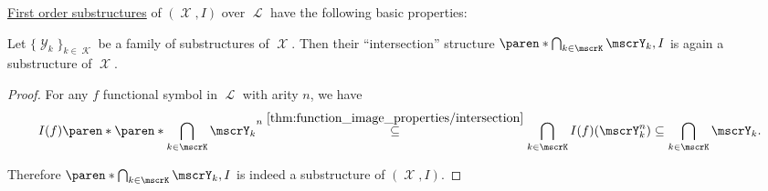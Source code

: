 \begin{proposition}\label{thm:first_order_substructure_properties}
  \hyperref[def:first_order_substructure]{First order substructures} of \( (\mscrX, I) \) over \( \mscrL \) have the following basic properties:
  \begin{propenum}
     Let \( \{ \mscrY_k \}_{k \in \mscrK} \) be a family of substructures of \( \mscrX \). Then their \enquote{intersection} structure \( \paren*{\bigcap_{k \in \mscrK} \mscrY_k, I} \) is again a substructure of \( \mscrX \).
  \end{propenum}
\end{proposition}
\begin{proof}
   For any \( f \) functional symbol in \( \mscrL \) with arity \( n \), we have
  \begin{equation*}
    I(f)\paren*{\paren*{\bigcap_{k \in \mscrK} \mscrY_k}^n}
    \overset {\ref{thm:function_image_properties/intersection}} \subseteq
    \bigcap_{k \in \mscrK} I(f)(\mscrY_k^n) \subseteq \bigcap_{k \in \mscrK} \mscrY_k.
  \end{equation*}

  Therefore \( \paren*{\bigcap_{k \in \mscrK} \mscrY_k, I} \) is indeed a substructure of \( (\mscrX, I) \).
\end{proof}

